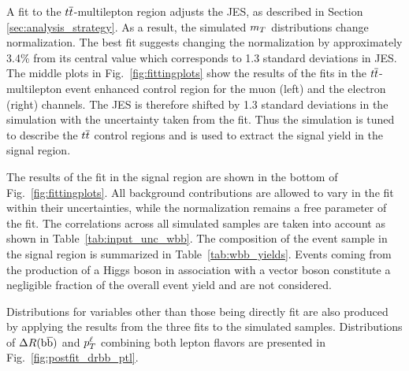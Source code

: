 A fit to the $t\overline{t}$-multilepton region adjusts
 the JES, as described in Section \ref{sec:analysis_strategy}.
As a result, the simulated $m_T$ distributions
 change normalization.
The best fit suggests changing the
 normalization by approximately 3.4\% from its central value
 which corresponds to 1.3 standard deviations in JES.
The middle plots in Fig.~\ref{fig:fittingplots}
 show the results of the fits in the $t\overline{t}$-multilepton
 event enhanced control region  for
 the muon (left)
 and the electron (right) channels.
The JES is therefore shifted by 1.3 standard deviations in
 the simulation with the uncertainty
 taken from the fit.
Thus the simulation is tuned to describe the $t\overline{t}$
 control regions and is
 used to extract the signal yield in the signal region.

The results of the fit in the \wbb signal region
 are shown in the bottom of Fig.~\ref{fig:fittingplots}.
All background contributions are allowed to vary
 in the fit within their uncertainties,
 while the \wbb normalization remains a free parameter of the fit.
The correlations across all simulated samples are taken into account
 as shown in Table~\ref{tab:input_unc_wbb}.
The composition of the event sample in
 the signal region is summarized in Table~\ref{tab:wbb_yields}.
Events coming from the production of a Higgs boson in association
 with a vector boson constitute a negligible fraction of the
 overall event yield and are not considered.

Distributions for variables other than those being directly fit are
 also produced by applying the results from the three fits to
 the simulated samples.
Distributions of $\Delta R(\mathrm{b\overline{b}})$ and $p_T^\ell$
 combining both lepton flavors are presented in Fig.~\ref{fig:postfit_drbb_ptl}.

